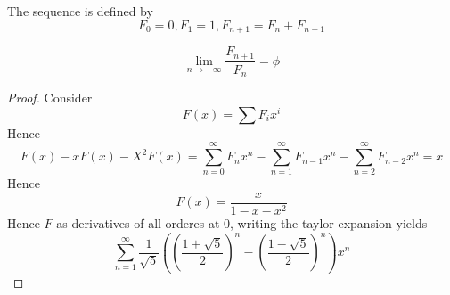 \documentclass[../main.tex]{subfiles}
\begin{document}
\begin{defn}
	The sequence is defined by 
	\[ 
		F_0=0, F_1=1, F_{n+1} = F_n + F_{n-1} 
	\]
	
\end{defn}
\begin{thm}
\[ 
\lim_{n \to  + \infty} \frac{F_{n+1} }{F_n} = \phi
\]

\end{thm}
\begin{proof}
Consider
\[ 
	F( x) = \sum F_i x^{i}
\]
Hence
\[ 
	F( x) - xF( x)  - X^{2}F( x) = \sum_{n=0}^{ \infty } F_n x^{n} - \sum_{n=1}^{ \infty }	F_{n-1}  x^{n} - \sum_{n=2}^{ \infty }F_{n-2} x^{n} = x
\]
Hence
\[ 
	F( x) = \frac{x}{1-x -x^{2}}
\]
 Hence $F$ as derivatives of all orderes at 0, writing the taylor expansion yields
 \[ 
	 \sum_{n=1}^{ \infty } \frac{1}{\sqrt{5} } \left( \left( \frac{1+ \sqrt{5} }{2} \right)^{n}-\left(  \frac{1-\sqrt{5} }{2} \right)^{n} \right)x^{n}
 \]

 		


\end{proof}
\end{document}
